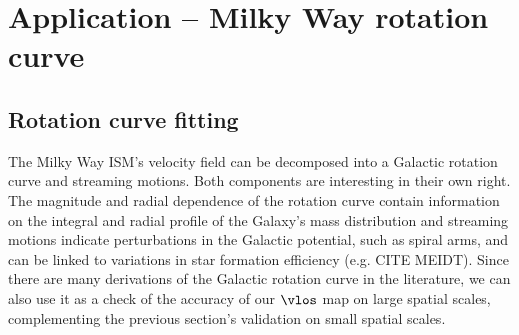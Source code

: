 \section{Application -- Milky Way rotation curve}
\label{sec:rotation_curve}

\subsection{Rotation curve fitting}
\label{sec:rotation_fit}
The Milky Way ISM's velocity field can be decomposed into a Galactic rotation curve and streaming motions. 
Both components are interesting in their own right.
The magnitude and radial dependence of the rotation curve contain information on the integral and radial profile of the Galaxy's mass distribution and streaming motions indicate perturbations in the Galactic potential, such as spiral arms, and can be linked to variations in star formation efficiency (e.g. CITE MEIDT). 
Since there are many derivations of the Galactic rotation curve in the literature, we can also use it as a check of the accuracy of our $\vlos$ map on large spatial scales, complementing the previous section's validation on small spatial scales.


